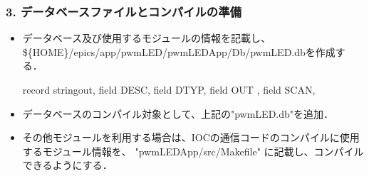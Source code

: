 \documentclass[letterpaper,10pt,dvipdfmx]{sphinxmanual}
\begin{document}
\subsubsection{3. データベースファイルとコンパイルの準備}
\label{\detokenize{epics/rst/example4__arduino_LEDcontrol02:id5}}\begin{itemize}
\item {} 
データベース及び使用するモジュールの情報を記載し、\$\{HOME\}/epics/app/pwmLED/pwmLEDApp/Db/pwmLED.dbを作成する．
\def\sphinxLiteralBlockLabel{\label{\detokenize{epics/rst/example4__arduino_LEDcontrol02:id8}}}
\begin{sphinxVerbatim}[commandchars=\\\{\},numbers=left,firstnumber=1,stepnumber=1]
record stringout,  
  field DESC,  
  field DTYP,  
  field OUT , 
  field SCAN,  
\end{sphinxVerbatim}

\item {} 
データベースのコンパイル対象として、上記の"pwmLED.db"を追加．

\begin{sphinxVerbatim}[commandchars=\\\{\}]
 

  
\end{sphinxVerbatim}

\item {} 
その他モジュールを利用する場合は、IOCの通信コードのコンパイルに使用するモジュール情報を、 "pwmLEDApp/src/Makefile" に記載し、コンパイルできるようにする．

\begin{sphinxVerbatim}[commandchars=\\\{\}]
 

   
   
   

  
  
\end{sphinxVerbatim}

\end{itemize}
\end{document}
